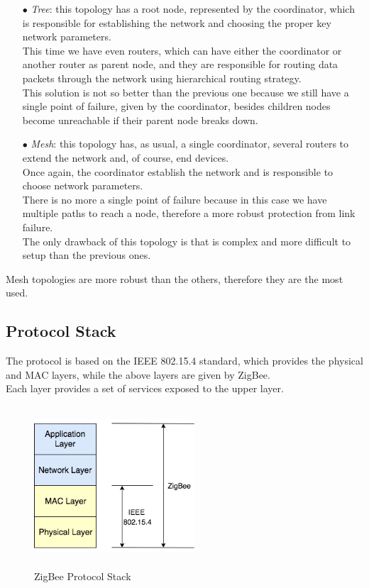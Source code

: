 \documentclass[12pt]{report}
\begin{document}
{{\begin{itemize}
\item[$\bullet$] \emph{Tree}: this topology has a root node, represented by the coordinator, which is responsible for establishing the network and choosing the proper key network parameters.\\
This time we have even routers, which can have either the coordinator or another router as parent node, and they are responsible for routing data packets through the network using hierarchical routing strategy.\\
This solution is not so better than the previous one because we still have a single point of failure, given by the coordinator, besides children nodes become unreachable if their parent node breaks down.

\item[$\bullet$] \emph{Mesh}: this topology has, as usual, a single coordinator, several routers to extend the network and, of course, end devices.\\
Once again, the coordinator establish the network and is responsible to choose network parameters.\\
There is no more a single point of failure because in this case we have multiple paths to reach a node, therefore a more robust protection from link failure.\\
The only drawback of this topology is that is complex and more difficult to setup than the previous ones.\\
\end{itemize}

Mesh topologies are more robust than the others, therefore they are the most used.\\

\clearpage
\subsection{Protocol Stack}
\bigskip

The protocol is based on the IEEE 802.15.4 standard, which provides the physical and MAC layers, while the above layers are given by ZigBee.\\
Each layer provides a set of services exposed to the upper layer.

\begin{figure}[H]
\includegraphics[width=6cm,height=6cm,keepaspectratio]{zigbee_stack}
\centering
\caption{ZigBee Protocol Stack}
\end{figure}

}}
\end{document}
